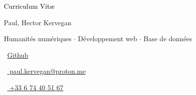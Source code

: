 \begin{scriptsize}
	 \textcolor{black}{Curriculum Vit\ae}
\end{scriptsize}

\vspace*{-0.10em}
\begin{Large} 
	Paul, Hector Kervegan
\end{Large}

\vspace*{0.25em}
\begin{scshape}
	\begin{footnotesize}
		  \textcolor{highlight2}{Humanités numériques $\cdot$ Développement web $\cdot$ Base de données}
		  
	\end{footnotesize}
\end{scshape}
\vspace*{0.4cm}

\begin{footnotesize}
	\begin{tiny}\faHome\end{tiny}~\href{https://github.com/paulhectork/}{Github}
	\quad \begin{tiny}\faEnvelope[regular]\end{tiny}~\href{mailto:paul.kervegan@proton.me}{%
		paul.kervegan@proton.me
	} 
	
	\begin{tiny}\faMobile*\end{tiny}~\href{tel:001555555555}{
		+33 6 74 40 51 67
	} 
	\quad

\end{footnotesize}